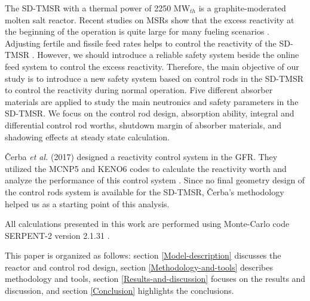 The \gls{SD-TMSR} with a thermal power of 2250 MW$_{th}$ \cite{ashraf2019whole_core,li_optimization_2018} is a graphite-moderated molten salt reactor. Recent studies on MSRs show that the excess reactivity at the beginning of the operation is quite large for many fueling scenarios \cite{ashraf2019whole_core,rykhlevskii2019modeling,betzler2016modeling,ashraf2018nuclear,ashraf2019modeling}. Adjusting fertile and fissile feed rates helps to control the reactivity of the SD-TMSR \cite{ashraf2019whole_core}. However, we should introduce a reliable safety system beside the online feed system to control the excess reactivity. Therefore, the main objective of our study is to introduce a new safety system based on control rods in the \gls{SD-TMSR} to control the reactivity during normal operation. Five different absorber materials are applied to study the main neutronics and safety parameters in the SD-TMSR. We focus on the control rod design, absorption ability, integral and differential control rod worths, shutdown margin of absorber materials, and shadowing effects at steady state calculation.

\v{C}erba \emph{et al.} (2017) designed a reactivity control system in the GFR. They utilized the MCNP5 \cite{briesmeister2000mcnptm} and KENO6 codes \cite{petrie1984keno} to calculate the reactivity worth and analyze the performance of this control system \cite{vcerba2017optimization}. Since no final geometry design of the control rods system is available for the SD-TMSR, \v{C}erba's methodology \cite{vcerba2017optimization}  helped us as a starting point of this analysis.

All calculations presented in this work are performed using Monte-Carlo code SERPENT-2 version 2.1.31 \cite{leppanen2014serpent}.

This paper is organized as follows: section \ref{Model-description} discusses the reactor and control rod design, section \ref{Methodology-and-tools} describes methodology and tools, section \ref{Results-and-discussion} focuses on the results and discussion, and section \ref{Conclusion} highlights the conclusions.